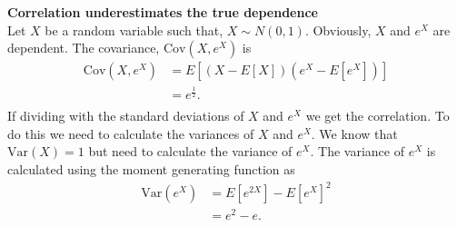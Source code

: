 \begin{example}\label{ex:CorrelationUnderestimates}
    \textbf{Correlation underestimates the true dependence} \\
    Let $X$ be a random variable such that, $X \sim N(0,1)$. Obviously, $X$ and $e^X$ are dependent. The covariance, $\mathrm{Cov}(X,e^X)$ is
    \begin{align*}
        \mathrm{Cov}(X,e^X) &= E \left[  (X-E\left[  X \right])(e^X-E\left[  e^X \right])  \right]\\
         &= e^{\frac{1}{2}}.\\
    \end{align*}
    If dividing with the standard deviations of $X$ and $e^X$ we get the correlation. To do this we need to calculate the variances of $X$ and $e^X$. We know that $\mathrm{Var}(X) = 1$ but need to calculate the variance of $e^X$. The variance of $e^X$ is calculated using the moment generating function as
    \begin{align*}
        \mathrm{Var}(e^X) &= E[e^{2X}] - E[e^X]^2\\
        &= e^2 - e.
    \end{align*}

\end{example}
